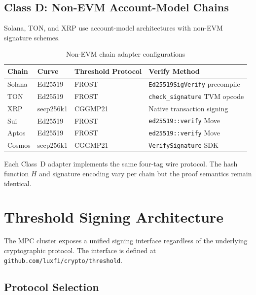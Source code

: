 \documentclass[11pt]{article}
\begin{document}
\subsection{Class D: Non-EVM Account-Model Chains}
\label{sec:class-d}

Solana, TON, and XRP use account-model architectures with non-EVM signature schemes.

\begin{table}[H]
\centering
\begin{tabular}{llll}
\toprule
\textbf{Chain} & \textbf{Curve} & \textbf{Threshold Protocol} & \textbf{Verify Method} \\
\midrule
Solana   & Ed25519     & FROST    & \texttt{Ed25519SigVerify} precompile \\
TON      & Ed25519     & FROST    & \texttt{check\_signature} TVM opcode \\
XRP      & secp256k1   & CGGMP21  & Native transaction signing \\
Sui      & Ed25519     & FROST    & \texttt{ed25519::verify} Move \\
Aptos    & Ed25519     & FROST    & \texttt{ed25519::verify} Move \\
Cosmos   & secp256k1   & CGGMP21  & \texttt{VerifySignature} SDK \\
\bottomrule
\end{tabular}
\caption{Non-EVM chain adapter configurations}
\label{tab:non-evm}
\end{table}

Each Class~D adapter implements the same four-tag wire protocol. The hash function $H$ and signature encoding vary per chain but the proof semantics remain identical.

\section{Threshold Signing Architecture}
\label{sec:threshold}

The MPC cluster exposes a unified signing interface regardless of the underlying cryptographic protocol. The interface is defined at \texttt{github.com/luxfi/crypto/threshold}.

\subsection{Protocol Selection}
\end{document}
